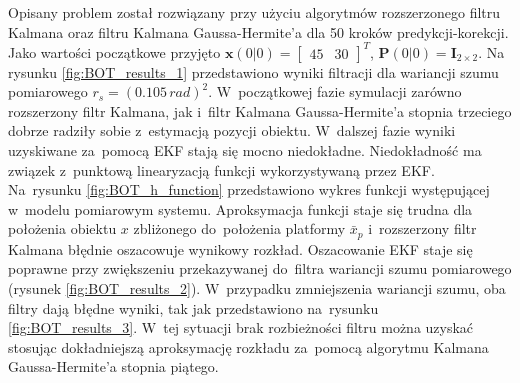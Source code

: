 \par
Opisany problem został rozwiązany przy użyciu algorytmów rozszerzonego filtru Kalmana oraz filtru Kalmana Gaussa-Hermite'a dla 50 kroków predykcji-korekcji. Jako wartości początkowe przyjęto $\boldsymbol{x}(0|0)=\begin{bmatrix}
45 & 30
\end{bmatrix}^T$, $\boldsymbol{P}(0|0) = \boldsymbol{I}_{2 \times 2}$. Na rysunku \ref{fig:BOT_results_1} przedstawiono wyniki filtracji dla wariancji szumu pomiarowego $r_s = (0.105\,rad)^2$. W~początkowej fazie symulacji zarówno rozszerzony filtr Kalmana, jak i~filtr Kalmana Gaussa-Hermite'a stopnia trzeciego dobrze radziły sobie z~estymacją pozycji obiektu. W~dalszej fazie wyniki uzyskiwane za~pomocą EKF stają się mocno niedokładne. Niedokładność ma związek z~punktową linearyzacją funkcji wykorzystywaną przez EKF. Na~rysunku \ref{fig:BOT_h_function} przedstawiono wykres funkcji występującej w~modelu pomiarowym systemu. Aproksymacja funkcji staje się trudna dla położenia obiektu $x$ zbliżonego do~położenia platformy $\bar{x}_p$ i~rozszerzony filtr Kalmana błędnie oszacowuje wynikowy rozkład. Oszacowanie EKF staje się poprawne przy zwiększeniu przekazywanej do~filtra wariancji szumu pomiarowego (rysunek \ref{fig:BOT_results_2}). W~przypadku zmniejszenia wariancji szumu, oba filtry dają błędne wyniki, tak jak przedstawiono na~rysunku \ref{fig:BOT_results_3}. W~tej sytuacji brak rozbieżności filtru można uzyskać stosując dokładniejszą aproksymację rozkładu za~pomocą algorytmu Kalmana Gaussa-Hermite'a stopnia piątego.

